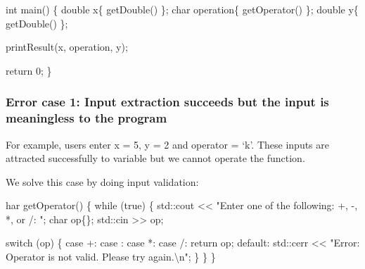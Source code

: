 \documentclass[
  letterpaper,
  DIV=11,
  numbers=noendperiod]{scrreprt}
\newenvironment{Shaded}{\begin{snugshade}}{\end{snugshade}}
\newcommand{\ControlFlowTok}[1]{\textcolor[rgb]{0.00,0.23,0.31}{#1}}
\newcommand{\DecValTok}[1]{\textcolor[rgb]{0.68,0.00,0.00}{#1}}
\newcommand{\ErrorTok}[1]{\textcolor[rgb]{0.68,0.00,0.00}{#1}}
\newcommand{\FunctionTok}[1]{\textcolor[rgb]{0.28,0.35,0.67}{#1}}
\newcommand{\NormalTok}[1]{\textcolor[rgb]{0.00,0.23,0.31}{#1}}
\newcommand{\SpecialCharTok}[1]{\textcolor[rgb]{0.37,0.37,0.37}{#1}}
\newcommand{\StringTok}[1]{\textcolor[rgb]{0.13,0.47,0.30}{#1}}
\begin{document}
\begin{Shaded}
\begin{Highlighting}[]
\NormalTok{int }\FunctionTok{main}\NormalTok{()}
\NormalTok{\{}
\NormalTok{    double x\{ }\FunctionTok{getDouble}\NormalTok{() \};}
\NormalTok{    char operation\{ }\FunctionTok{getOperator}\NormalTok{() \};}
\NormalTok{    double y\{ }\FunctionTok{getDouble}\NormalTok{() \};}

    \FunctionTok{printResult}\NormalTok{(x, operation, y);}

\NormalTok{    return }\DecValTok{0}\NormalTok{;}
\NormalTok{\}}
\end{Highlighting}
\end{Shaded}

\hypertarget{error-case-1-input-extraction-succeeds-but-the-input-is-meaningless-to-the-program}{%
\subsubsection{Error case 1: Input extraction succeeds but the input is
meaningless to the
program}\label{error-case-1-input-extraction-succeeds-but-the-input-is-meaningless-to-the-program}}

For example, users enter x = 5, y = 2 and operator = `k'. These inputs
are attracted successfully to variable but we cannot operate the
function.

We solve this case by doing input validation:

\begin{Shaded}
\begin{Highlighting}[]
\NormalTok{har }\FunctionTok{getOperator}\NormalTok{()}
\NormalTok{\{}
    \ControlFlowTok{while}\NormalTok{ (true)}
\NormalTok{    \{}
\NormalTok{        std}\SpecialCharTok{::}\NormalTok{cout }\SpecialCharTok{\textless{}}\ErrorTok{\textless{}} \StringTok{"Enter one of the following: +, {-}, *, or /: "}\NormalTok{;}
\NormalTok{        char op\{\};}
\NormalTok{        std}\SpecialCharTok{::}\NormalTok{cin }\SpecialCharTok{\textgreater{}}\ErrorTok{\textgreater{}}\NormalTok{ op;}

        \ControlFlowTok{switch}\NormalTok{ (op)}
\NormalTok{        \{}
\NormalTok{        case }\StringTok{\textquotesingle{}+\textquotesingle{}}\SpecialCharTok{:}
\NormalTok{        case }\StringTok{\textquotesingle{}{-}\textquotesingle{}}\SpecialCharTok{:}
\NormalTok{        case }\StringTok{\textquotesingle{}*\textquotesingle{}}\SpecialCharTok{:}
\NormalTok{        case }\StringTok{\textquotesingle{}/\textquotesingle{}}\SpecialCharTok{:}
\NormalTok{            return op;}
\NormalTok{        default}\SpecialCharTok{:}
\NormalTok{            std}\SpecialCharTok{::}\NormalTok{cerr }\SpecialCharTok{\textless{}}\ErrorTok{\textless{}} \StringTok{"Error: Operator is not valid. Please try again.}\SpecialCharTok{\textbackslash{}n}\StringTok{"}\NormalTok{;}
\NormalTok{        \}}
\NormalTok{    \}}
\NormalTok{\}}
\end{Highlighting}
\end{Shaded}
\end{document}
